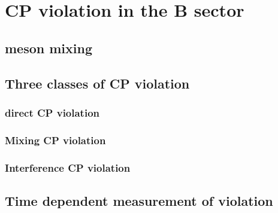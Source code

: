 \chapter{CP violation in the B sector}

\blindtext

\section{\B meson mixing}

\Blindtext

\section{Three classes of CP violation}

\blindtext

\subsection{direct CP violation}

\blindtext

\subsection{Mixing CP violation}

\blindtext

\subsection{Interference CP violation}

\blindtext

\section{Time dependent measurement of \CP violation}

\Blindtext
